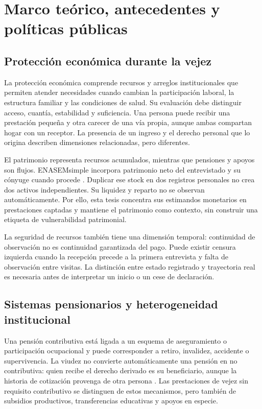 \chapter{Marco teórico, antecedentes y políticas públicas}
\label{cap:marco}

\section{Protección económica durante la vejez}

La protección económica comprende recursos y arreglos institucionales que
permiten atender necesidades cuando cambian la participación laboral, la
estructura familiar y las condiciones de salud. Su evaluación debe distinguir
acceso, cuantía, estabilidad y suficiencia. Una persona puede recibir una
prestación pequeña y otra carecer de una vía propia, aunque ambas compartan
hogar con un receptor. La presencia de un ingreso y el derecho personal que
lo origina describen dimensiones relacionadas, pero diferentes.

El patrimonio representa recursos acumulados, mientras que pensiones y apoyos
son flujos. ENASEMsimple incorpora patrimonio neto del entrevistado y su
cónyuge cuando procede \citep{enasem2025simple}. Duplicar ese stock en dos
registros personales no crea dos activos independientes. Su liquidez y reparto
no se observan automáticamente. Por ello, esta tesis concentra sus estimandos
monetarios en prestaciones captadas y mantiene el patrimonio como contexto,
sin construir una etiqueta de vulnerabilidad patrimonial.

La seguridad de recursos también tiene una dimensión temporal: continuidad
de observación no es continuidad garantizada del pago. Puede existir censura
izquierda cuando la recepción precede a la primera entrevista y falta de
observación entre visitas. La distinción entre estado registrado y trayectoria
real es necesaria antes de interpretar un inicio o un cese de declaración.

\section{Sistemas pensionarios y heterogeneidad institucional}
\label{sec:pensiones-contexto}

Una pensión contributiva está ligada a un esquema de aseguramiento o
participación ocupacional y puede corresponder a retiro, invalidez, accidente
o supervivencia. La viudez no convierte automáticamente una pensión en no
contributiva: quien recibe el derecho derivado es su beneficiario, aunque la
historia de cotización provenga de otra persona
\citep{lss1995,issste2007}. Las prestaciones de vejez sin requisito contributivo
se distinguen de estos mecanismos, pero también de subsidios productivos,
transferencias educativas y apoyos en especie.

